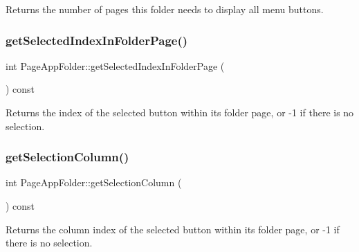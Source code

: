 \begin{DoxyReturn}{Returns}
the number of pages this folder needs to display all menu buttons. 
\end{DoxyReturn}
\mbox{\label{classPageAppFolder_a1c59f6ee22e0ba08d47a8e5e9a9a29de}} 
\subsubsection{\texorpdfstring{get\+Selected\+Index\+In\+Folder\+Page()}{getSelectedIndexInFolderPage()}}
{\footnotesize\ttfamily int Page\+App\+Folder\+::get\+Selected\+Index\+In\+Folder\+Page (\begin{DoxyParamCaption}{ }\end{DoxyParamCaption}) const}

\begin{DoxyReturn}{Returns}
the index of the selected button within its folder page, or -\/1 if there is no selection. 
\end{DoxyReturn}
\mbox{\label{classPageAppFolder_ae70550dbace1ea8619b8a3b02a9896e9}} 
\subsubsection{\texorpdfstring{get\+Selection\+Column()}{getSelectionColumn()}}
{\footnotesize\ttfamily int Page\+App\+Folder\+::get\+Selection\+Column (\begin{DoxyParamCaption}{ }\end{DoxyParamCaption}) const}

\begin{DoxyReturn}{Returns}
the column index of the selected button within its folder page, or -\/1 if there is no selection. 
\end{DoxyReturn}
\mbox{\label{classPageAppFolder_a12d9149b5502f2bef56542f65a298964}} 

